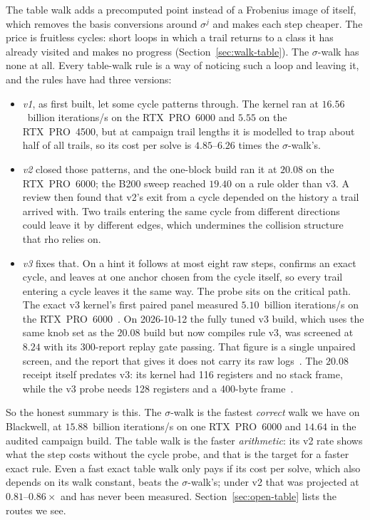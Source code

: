 The table walk adds a precomputed point instead of a Frobenius image
of itself, which removes the basis conversions around $\sigma^j$ and
makes each step cheaper. The price is fruitless cycles: short loops
in which a trail returns to a class it has already visited and makes
no progress (Section~\ref{sec:walk-table}). The $\sigma$-walk has none
at all. Every table-walk rule is a way of noticing such a loop and
leaving it, and the rules have had three versions:
\begin{itemize}[leftmargin=1.2em,itemsep=0.2em]
\item \emph{v1}, as first built, let some cycle patterns through.
  The kernel ran at $16.56$~billion iterations/s on the RTX~PRO~6000
  and $5.55$ on the RTX~PRO~4500, but at campaign trail lengths it is
  modelled to trap about half of all trails, so its cost per solve is
  $4.85$--$6.26$ times the $\sigma$-walk's.
\item \emph{v2} closed those patterns, and the one-block build ran it
  at $20.08$ on the RTX~PRO~6000; the B200 sweep reached $19.40$ on a
  rule older than v3. A review then found that v2's exit from a cycle
  depended on the history a trail arrived with. Two trails entering
  the same cycle from different directions could leave it by different
  edges, which undermines the collision structure that rho relies on.
\item \emph{v3} fixes that. On a hint it follows at most eight raw
  steps, confirms an exact cycle, and leaves at one anchor chosen from
  the cycle itself, so every trail entering a cycle leaves it the same
  way. The probe sits on the critical path. The exact v3 kernel's
  first paired panel measured $5.10$~billion iterations/s on the
  RTX~PRO~6000~.
  On 2026-10-12 the fully tuned v3 build, which uses the same knob set
  as the $20.08$ build but now compiles rule v3, was screened at
  $8.24$ with its 300-report replay gate passing. That figure is a
  single unpaired screen, and the report that gives it does not carry
  its raw logs~. The $20.08$ receipt itself
  predates v3: its kernel had 116 registers and no stack frame, while
  the v3 probe needs 128 registers and a 400-byte
  frame~.
\end{itemize}

So the honest summary is this. The $\sigma$-walk is the fastest
\emph{correct} walk we have on Blackwell, at $15.88$~billion iterations/s
on one RTX~PRO~6000 and $14.64$ in the audited campaign build. The table
walk is the faster \emph{arithmetic}: its v2 rate shows what the step
costs without the cycle probe, and that is the target for a faster
exact rule. Even a fast exact table walk only pays if its cost per
solve, which also depends on its walk constant, beats the
$\sigma$-walk's; under v2 that was projected at $0.81$--$0.86\times$ and has
never been measured. Section~\ref{sec:open-table} lists the routes we
see.

